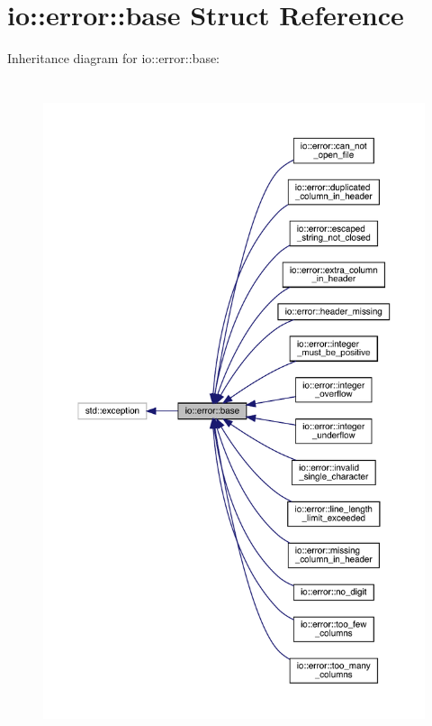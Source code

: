 \hypertarget{structio_1_1error_1_1base}{}\section{io\+:\+:error\+:\+:base Struct Reference}
\label{structio_1_1error_1_1base}


Inheritance diagram for io\+:\+:error\+:\+:base\+:
\nopagebreak
\begin{figure}[H]
\begin{center}
\leavevmode
\includegraphics[height=550pt]{structio_1_1error_1_1base__inherit__graph}
\end{center}
\end{figure}


